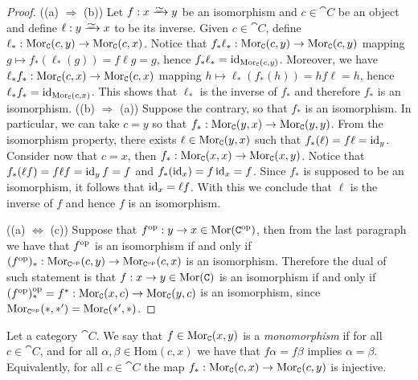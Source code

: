 \begin{proof}
    ((a) \(\Rightarrow\) (b)) Let \(f: x \isoto y\) be an isomorphism and \(c
    \in \cat C\) be an object and define \(\ell : y \isoto x\) to be its inverse.
    Given \(c \in \cat C\), define \(\ell_*: \operatorname{Mor}_{\texttt C}(c, y) \to \operatorname{Mor}_{\texttt
        C}(c, x)\). Notice that \(f_* \ell_* : \operatorname{Mor}_{\texttt C}(c, y) \to
    \operatorname{Mor}_{\texttt C}(c, y)\) mapping \(g \mapsto f_*(\ell_*(g)) = f \ell
    g = g\), hence \(f_* \ell_* = \operatorname{id}_{\operatorname{Mor}_{\texttt C}(c, y)}\). Moreover, we
    have \(\ell_* f_* : \operatorname{Mor}_{\texttt C}(c, x) \to \operatorname{Mor}_{\texttt C}(c, x)\) mapping \(h \mapsto
    \ell_*(f_*(h)) = h f \ell = h\), hence
    \(\ell_* f_* = \operatorname{id}_{\operatorname{Mor}_{\texttt C}(c, x)}\). This shows that \(\ell_*\)
    is the inverse of \(f_*\) and therefore \(f_*\) is an isomorphism. ((b)
    \(\Rightarrow\) (a)) Suppose the contrary, so that \(f_*\) is an isomorphism.
    In particular, we can take \(c = y\) so that \(f_*: \operatorname{Mor}_{\texttt C}(y, x) \to
    \operatorname{Mor}_{\texttt C}(y, y)\). From the isomorphism property, there exists \(\ell \in
    \operatorname{Mor}_{\texttt C}(y, x)\) such that \(f_*(\ell) = f \ell = \operatorname{id}_y\). Consider
    now that \(c = x\), then \(f_*: \operatorname{Mor}_{\texttt C}(x, x) \to \operatorname{Mor}_{\texttt C}(x, y)\).
    Notice that \(f_*(\ell f) = f \ell f = \operatorname{id}_y f = f\)
    and \(f_*(\operatorname{id}_x) = f \operatorname{id}_x = f\). Since \(f_*\) is supposed to be an
    isomorphism, it follows that \(\operatorname{id}_x = \ell f\). With this we conclude
    that \(\ell\) is the inverse of \(f\) and hence \(f\) is an isomorphism.

    ((a) \(\Leftrightarrow\) (c)) Suppose that
    \(f^{\mathrm{op}}: y \to x \in \operatorname{Mor}(\texttt C^{\mathrm{op}})\), then from the last paragraph we have
    that \(f^{\mathrm{op}}\) is an isomorphism if and only if
    \((f^{\mathrm{op}})_* : \operatorname{Mor}_{\texttt C^{\mathrm{op}}}(c, y) \to \operatorname{Mor}_{\texttt C^{\mathrm{op}}}(c, x)\) is an
    isomorphism. Therefore the dual of such statement is that
    \(f: x \to y \in \operatorname{Mor}(\texttt C)\) is an isomorphism if and only if
    \((f^{\mathrm{op}})_*^{\mathrm{op}} = f^*: \operatorname{Mor}_{\texttt C}(x, c) \to \operatorname{Mor}_{\texttt C}(y, c)\) is an
    isomorphism, since \(\operatorname{Mor}_{\texttt C^{\mathrm{op}}}(*, *') = \operatorname{Mor}_{\texttt C}(*', *)\).
\end{proof}

\begin{definition}[Monomorphism]\label{def: monomorphism}
    Let a category \(\cat{C}\). We say that \(f \in \operatorname{Mor}_{\texttt C}(x, y)\) is a
    \emph{monomorphism} if for all \(c \in \cat{C}\), and for all \(\alpha, \beta
    \in \mathrm{Hom}(c, x)\) we have that \(f \alpha = f \beta\) implies \(\alpha
    = \beta\). Equivalently, for all \(c \in \cat C\) the map \(f_*: \operatorname{Mor}_{\texttt
        C}(c, x) \to \operatorname{Mor}_{\texttt C}(c, y)\) is injective.
\end{definition}

